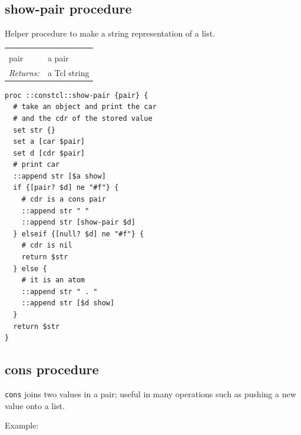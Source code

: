 \documentclass[twoside,9pt]{report}
\begin{document}
\subsection{show-pair procedure}
\label{show-pair-procedure}


Helper procedure to make a string representation of a list.

\noindent\begin{tabular}{ |p{1.5cm} p{8cm}| }
\hline
\rowcolor[HTML]{CCCCCC} \multicolumn{2}{|l|}{\bf show-pair (internal)} \\
pair & a pair \\
\textit{Returns:} & a Tcl string \\
\hline
\end{tabular}
\begin{lstlisting}
proc ::constcl::show-pair {pair} {
  # take an object and print the car
  # and the cdr of the stored value
  set str {}
  set a [car $pair]
  set d [cdr $pair]
  # print car
  ::append str [$a show]
  if {[pair? $d] ne "#f"} {
    # cdr is a cons pair
    ::append str " "
    ::append str [show-pair $d]
  } elseif {[null? $d] ne "#f"} {
    # cdr is nil
    return $str
  } else {
    # it is an atom
    ::append str " . "
    ::append str [$d show]
  }
  return $str
}
\end{lstlisting}
\subsection{cons procedure}
\label{cons-procedure}


\texttt{cons} joins two values in a pair; useful in many operations such as pushing a new value onto a list.



Example:
\end{document}
